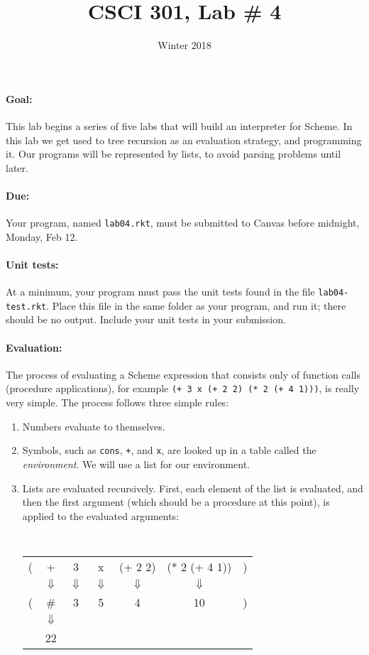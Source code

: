 \documentclass{article}
\title{CSCI 301, Lab \# 4}
\author{Winter 2018}
\date{}
\begin{document}
\maketitle


\paragraph{Goal:} This lab begins a series of five labs that will
build an interpreter for Scheme.  In this lab we get used to
tree recursion as an evaluation strategy, and programming it.
Our programs will be represented by lists, to avoid parsing problems
until later.

\paragraph{Due:} Your program, named {\tt lab04.rkt}, must be submitted to
Canvas before midnight, Monday, Feb 12.

\paragraph{Unit tests:}
At a minimum, your program must pass the unit tests found in the
file {\tt lab04-test.rkt}.  Place this file in the same folder
as your program, and run it;  there should be no output.  Include
your unit tests in your submission.

\paragraph{Evaluation:}  
The process of evaluating a Scheme expression that consists only of
function calls (procedure applications), for example
{\tt (+  3 x (+ 2 2) (* 2 (+ 4 1)))}, is really very simple.
The process follows three simple rules:
\begin{enumerate}
\item Numbers evaluate to themselves.
\item Symbols, such as {\tt cons}, {\tt +}, and {\tt x},
  are looked up in a table
  called the {\em environment}.  We will use a list for our
  environment. 
\item Lists are evaluated recursively.  First,
  each element of the list is evaluated, and then the first argument
  (which should be a procedure at this point), is applied to the
  evaluated arguments:

{\tt
  \begin{tabular}{ccccccc}
    ( & + & 3 & x & (+ 2 2) & (* 2 (+ 4 1)) & )\\
    & $\Downarrow$& $\Downarrow$& $\Downarrow$& $\Downarrow$& $\Downarrow$& \\
    ( & \#<procedure:+> & 3 & 5 & 4 & 10 & )\\
    &$\Downarrow$ \\
    &22\\
  \end{tabular}
}
\end{enumerate}
\end{document}
